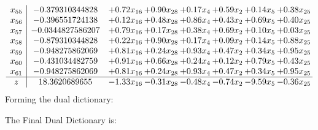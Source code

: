 \documentclass[8pt]{article}
\begin{document}
\[\begin{array}{c| c c@{\hskip 2pt} c@{\hskip 2pt} c@{\hskip 2pt} c@{\hskip 2pt} c@{\hskip 2pt} c@{\hskip 2pt} }
 x_{55}   &  -0.379310344828 & +  0.72 x_{16} & +  0.90 x_{28} & +  0.17 x_{4} & +  0.59 x_{2} & +  0.14 x_{5} & +  0.38 x_{25}\\
 x_{56}   &  -0.396551724138 & +  0.12 x_{16} & +  0.48 x_{28} & +  0.86 x_{4} & +  0.43 x_{2} & +  0.69 x_{5} & +  0.40 x_{25}\\
 x_{57}   &  -0.0344827586207 & +  0.79 x_{16} & +  0.17 x_{28} & +  0.38 x_{4} & +  0.69 x_{2} & +  0.10 x_{5} & +  0.03 x_{25}\\
 x_{58}   &  -0.879310344828 & +  0.22 x_{16} & +  0.90 x_{28} & +  0.17 x_{4} & +  0.09 x_{2} & +  0.14 x_{5} & +  0.88 x_{25}\\
 x_{59}   &  -0.948275862069 & +  0.81 x_{16} & +  0.24 x_{28} & +  0.93 x_{4} & +  0.47 x_{2} & +  0.34 x_{5} & +  0.95 x_{25}\\
 x_{60}   &  -0.431034482759 & +  0.91 x_{16} & +  0.66 x_{28} & +  0.24 x_{4} & +  0.12 x_{2} & +  0.79 x_{5} & +  0.43 x_{25}\\
 x_{61}   &  -0.948275862069 & +  0.81 x_{16} & +  0.24 x_{28} & +  0.93 x_{4} & +  0.47 x_{2} & +  0.34 x_{5} & +  0.95 x_{25}\\
\hline
z    &  18.3620689655 & -1.33 x_{16} & -0.31 x_{28} & -0.48 x_{4} & -0.74 x_{2} & -9.59 x_{5} & -0.36 x_{25}\\
\end{array}\]
Forming the dual dictionary:

The Final Dual Dictionary is: 
\end{document}

